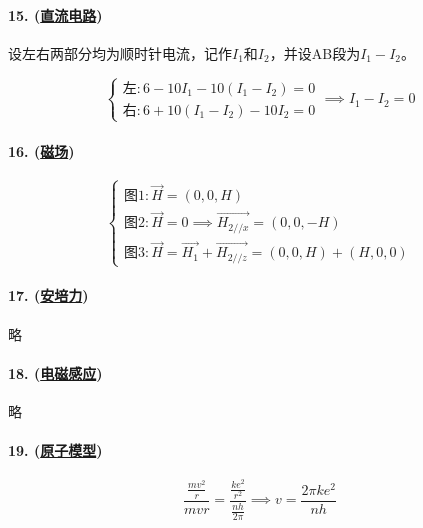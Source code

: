 \paragraph{15. (\hyperref[subsec:直流电路]{直流电路})} 设左右两部分均为顺时针电流，记作$I_1$和$I_2$，并设AB段为$I_1-I_2$。

\begin{equation*}
    \begin{cases}
        \textrm{左}: 6-10I_1-10(I_1-I_2)=0\\
        \textrm{右}: 6+10(I_1-I_2)-10I_2=0
    \end{cases}\implies
    I_1-I_2=0
\end{equation*}

\paragraph{16. (\hyperref[subsec:磁场]{磁场})}

\begin{equation*}
    \begin{cases}
        \textrm{图1}: \vec{H}=(0,0,H)\\
        \textrm{图2}: \vec{H}=0\implies \vec{H_{2//x}}=(0,0,-H)\\
        \textrm{图3}: \vec{H}=\vec{H_1}+\vec{H_{2//z}}=(0,0,H)+(H,0,0)
    \end{cases}
\end{equation*}

\paragraph{17. (\hyperref[subsec:安培力]{安培力})} 略
\paragraph{18. (\hyperref[subsec:电磁感应]{电磁感应})} 略
\paragraph{19. (\hyperref[sec:原子模型]{原子模型})}

\begin{equation*}
    \frac{\frac{mv^2}{r}}{mvr}=\frac{\frac{ke^2}{r^2}}{\frac{nh}{2\pi}}\implies
    v=\frac{2\pi ke^2}{nh}
\end{equation*}
